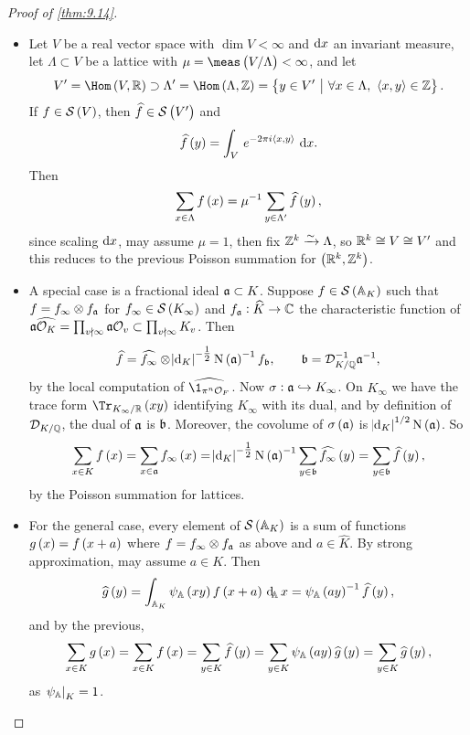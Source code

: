 \begin{proof}[Proof of \ref{thm:9.14}]
\hfill
\begin{itemize}
\item Let $ V $ be a real vector space with $ \dim V < \infty $ and $ \mathrm{d} x $ an invariant measure, let $ \Lambda \subset V $ be a lattice with $ \mu = \meas\br{V / \Lambda} < \infty $, and let
$$ V' = \Hom\br{V, \RR} \supset \Lambda' = \Hom\br{\Lambda, \ZZ} = \cbr{y \in V' \st \forall x \in \Lambda, \ \abr{x, y} \in \ZZ}. $$
If $ f \in \SSS\br{V} $, then $ \widehat{f} \in \SSS\br{V'} $ and
$$ \widehat{f}\br{y} = \intd{V}{}{e^{-2\pi i\abr{x, y}}}{x}. $$
Then
$$ \sum_{x \in \Lambda} f\br{x} = \mu^{-1}\sum_{y \in \Lambda'} \widehat{f}\br{y}, $$
since scaling $ \mathrm{d} x $, may assume $ \mu = 1 $, then fix $ \mathbb{Z}^k \xrightarrow{\sim} \Lambda $, so $ \mathbb{R}^k \cong V \cong V' $ and this reduces to the previous Poisson summation for $ \br{\RR^k, \ZZ^k} $.

\pagebreak

\item A special case is a fractional ideal $ \mathfrak{a} \subset K $. Suppose $ f \in \SSS\br{\AA_K} $ such that $ f = f_\infty \otimes f_{\mathfrak{a}} $ for $ f_\infty \in \SSS\br{K_\infty} $ and $ f_{\mathfrak{a}} : \widehat{K} \to \mathbb{C} $ the characteristic function of $ \mathfrak{a}\widehat{\mathcal{O}_K} = \prod_{v \nmid \infty} \mathfrak{a}\mathcal{O}_v \subset \prod_{v \nmid \infty} K_v $. Then
$$ \widehat{f} = \widehat{f_\infty} \otimes \abs{\d_K}^{-\tfrac{1}{2}}\N\br{\aaa}^{-1}f_\bbb, \qquad \bbb = \DDD_{K / \QQ}^{-1}\aaa^{-1}, $$
by the local computation of $ \widehat{\1_{\pi^n\OOO_F}} $. Now $ \sigma : \mathfrak{a} \hookrightarrow K_\infty $. On $ K_\infty $ we have the trace form $ \Tr_{K_\infty / \RR}\br{xy} $ identifying $ K_\infty $ with its dual, and by definition of $ \mathcal{D}_{K / \mathbb{Q}} $, the dual of $ \mathfrak{a} $ is $ \mathfrak{b} $. Moreover, the covolume of $ \sigma\br{\aaa} $ is $ \abs{\d_K}^{1 / 2}\N\br{\aaa} $. So
$$ \sum_{x \in K} f\br{x} = \sum_{x \in \aaa} f_\infty\br{x} = \abs{\d_K}^{-\tfrac{1}{2}}\N\br{\aaa}^{-1}\sum_{y \in \bbb} \widehat{f_\infty}\br{y} = \sum_{y \in \bbb} \widehat{f}\br{y}, $$
by the Poisson summation for lattices.
\item For the general case, every element of $ \SSS\br{\AA_K} $ is a sum of functions $ g\br{x} = f\br{x + a} $ where $ f = f_\infty \otimes f_{\mathfrak{a}} $ as above and $ a \in \widehat{K} $. By strong approximation, may assume $ a \in K $. Then
$$ \widehat{g}\br{y} = \intA{\psi_\AA\br{xy}f\br{x + a}}{x} = \psi_\AA\br{ay}^{-1}\widehat{f}\br{y}, $$
and by the previous,
$$ \sum_{x \in K} g\br{x} = \sum_{x \in K} f\br{x} = \sum_{y \in K} \widehat{f}\br{y} = \sum_{y \in K} \psi_\AA\br{ay}\widehat{g}\br{y} = \sum_{y \in K} \widehat{g}\br{y}, $$
as $ \left. \psi_{\mathbb{A}} \right|_K = 1 $.
\end{itemize}
\end{proof}

